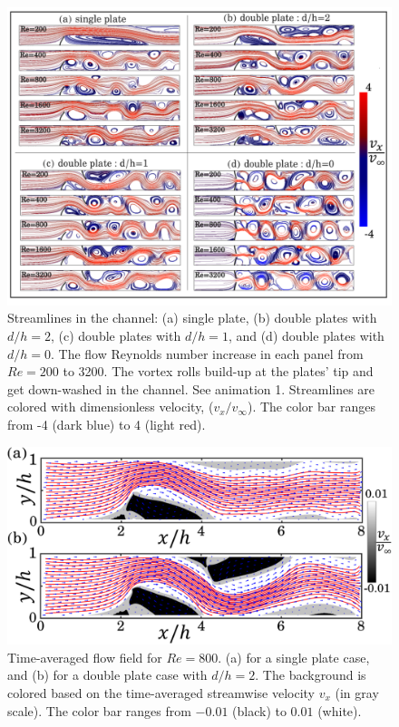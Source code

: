\documentclass[aps,pre,twocolumn,aps,longbibliography]{revtex4-1}
\begin{document}
	
	\begin{figure}
		\begin{minipage}[c]{1\linewidth}
			\includegraphics[width=1\linewidth]{Fig08.pdf} 
		\end{minipage} 
		\caption{Streamlines in the channel: (a) single plate, (b) double plates with $d/h=2$, (c) double plates with $d/h=1$, and (d) double plates with $d/h=0$. The flow Reynolds number increase in each panel from $Re=200$ to 3200. The vortex rolls build-up at the plates' tip and get down-washed in the channel. See animation 1. Streamlines are colored with dimensionless velocity, ($v_x/v_{\infty}$). The color bar ranges from -4 (dark blue) to 4 (light red).}
		\label{fig:streamlines}
	\end{figure}
	
	\begin{figure}[b]
		\begin{minipage}{1\linewidth}
			\includegraphics[width=1\linewidth]{Fig09.pdf} 
		\end{minipage} 
		\caption{Time-averaged flow field for $Re=800$. (a) for a single plate case, and (b) for a double plate case with $d/h=2$. The background is colored based on the time-averaged streamwise velocity $v_x$ (in gray scale). The color bar ranges from $-0.01$ (black) to $0.01$ (white).}
		\label{fig:stream_timeavg}
	\end{figure}
	
\end{document}

